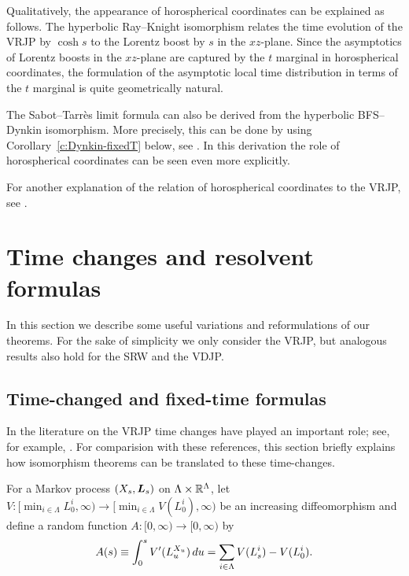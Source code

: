 \documentclass[11pt,a4paper]{article}
\begin{document}
\begin{remark}
  \label{rk:SThoro}
  Qualitatively, the appearance of horospherical coordinates can
  be explained as follows.  The hyperbolic Ray--Knight isomorphism
  relates the time evolution of the VRJP by $\cosh s$ to the Lorentz
  boost by $s$ in the $xz$-plane.
  Since the asymptotics of Lorentz boosts in the
  $xz$-plane are captured by the
  $t$ marginal in horospherical coordinates,
  the formulation of the asymptotic local time distribution in terms
  of the $t$ marginal is quite geometrically natural.

  The Sabot--Tarr\`{e}s limit formula \cite[Theorem~2]{MR3420510} can
  also be derived from the hyperbolic BFS--Dynkin isomorphism.  More
  precisely, this can be done by using Corollary~\ref{c:Dynkin-fixedT}
  below, see \cite{SwanPhD}.  In this derivation the role of
  horospherical coordinates can be seen even more explicitly.

 For another explanation of the relation of horospherical
  coordinates to the VRJP, see \cite{MerklRollesTarres}.
\end{remark}


\section{Time changes and resolvent formulas}
\label{sec:TC-HK}

In this section we describe some useful variations and reformulations
of our theorems. For the sake of simplicity
we only consider the VRJP, but analogous results
also hold for the SRW and the VDJP.

\subsection{Time-changed and fixed-time formulas}
\label{sec:TC}

In the literature on the VRJP time changes
have played an important role; see, for example, \cite{MR3420510}.
For comparision with these references,
this section briefly explains how isomorphism theorems can be
translated to these time-changes.

For a Markov process $(X_{s},\boldsymbol{L}_{s})$ on
$\Lambda \times \mathbb{R}^{\Lambda}$, let
$V\colon [\min_{ i\in\Lambda} L_0^i, \infty)\to [\min_{i\in\Lambda} V(L_0^i), \infty)$ be an increasing diffeomorphism and
define a random function $A\colon [0, \infty) \to [0, \infty)$ by
\begin{equation}
\label{e:Adef}
A(s) \equiv \int_{0}^{s} V'(L_{u}^{X_{u}})\,du = \sum_{i\in\Lambda}V(L_{s}^{i}) - V(L_0^i).
\end{equation}
\end{document}
